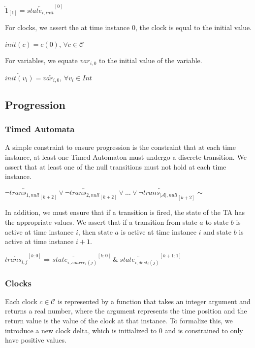 \documentclass[a4paper,11pt]{article}
\begin{document}
\(\overleftarrow{1}_{[1]} = \overleftarrow{state_{i,init}}^{[0]}\)

For clocks, we assert the at time instance 0, the clock is equal to the initial
value.

\(init(c) = c(0)\), \(\forall c \in \mathcal{C}\)

For variables, we equate \(var_{i,0}\) to the initial value of the variable.

\(\overleftarrow{init(v_i)} = \overleftarrow{var_{i,0}}\), \(\forall v_i \in Int\)

\subsection{Progression}
\label{sec:org4f992d0}

\subsubsection{Timed Automata}
\label{sec:orgcf3e3e5}

A simple constraint to ensure progression is the constraint that at each time
instance, at least one Timed Automaton must undergo a discrete transition. We
assert that at least one of the null transitions must not hold at each time
instance.

\(\neg\overleftarrow{trans_{1,null}}_{[k+2]} \lor
\neg\overleftarrow{trans_{2,null}}_{[k+2]} \lor \ldots \lor
\neg\overleftarrow{trans_{|\mathcal{A}|,null}}_{[k+2]}\sim\)

In addition, we must ensure that if a transition is fired, the state of the TA
has the appropriate values. We assert that if a
transition from state \(a\) to state \(b\) is active at time instance \(i\),
then state \(a\) is active at time instance \(i\) and state \(b\) is active at
time instance \(i+1\).

\(\overleftarrow{trans_{i,j}}^{[k:0]} \Rightarrow
\overleftarrow{state_{i,source_i(j)}}^{[k:0]}\ \&\
\overleftarrow{state_{i,dest_i(j)}}^{[k+1:1]}\)

\subsubsection{Clocks}
\label{sec:org0b823bc}

Each clock \(c \in \mathcal{C}\) is represented by a function that takes an integer argument
and returns a real number, where the argument represents the time position and
the return value is the value of the clock at that instance. To formalize this,
we introduce a new clock delta, which is initialized to 0 and is constrained to
only have positive values.
\end{document}
